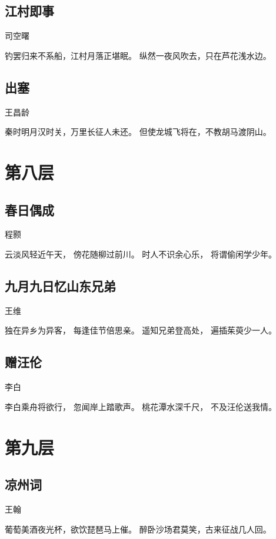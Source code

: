 \documentclass[12pt,UTF8]{ctexbook}
\begin{document}
\section{江村即事}

司空曙

钓罢归来不系船，江村月落正堪眠。
纵然一夜风吹去，只在芦花浅水边。

\section{出塞}

王昌龄

秦时明月汉时关，万里长征人未还。
但使龙城飞将在，不教胡马渡阴山。

\chapter{第八层}

\section{春日偶成}

程颢

云淡风轻近午天，
傍花随柳过前川。
时人不识余心乐，
将谓偷闲学少年。

\section{九月九日忆山东兄弟}

王维

独在异乡为异客，
每逢佳节倍思亲。
遥知兄弟登高处，
遍插茱萸少一人。

\section{赠汪伦}

李白

李白乘舟将欲行，
忽闻岸上踏歌声。
桃花潭水深千尺，
不及汪伦送我情。

\chapter{第九层}

\section{凉州词}

王翰

葡萄美酒夜光杯，欲饮琵琶马上催。
醉卧沙场君莫笑，古来征战几人回。
\end{document}
